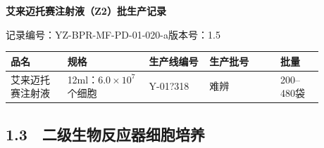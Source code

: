 \documentclass[UTF8,10pt,a4paper,fontset=fandol]{ctexart}
\newcommand{\fieldvalue}[1]{#1}
\newcommand{\handwritten}[1]{#1}
\begin{document}
\newpage

\begin{center}
{\Large \textbf{艾来迈托赛注射液（Z2）批生产记录}}
\end{center}

\noindent
记录编号：YZ-BPR-MF-PD-01-020-a\hfill 版本号：1.5

\begin{center}
\begin{tabular}{|p{0.16\linewidth}|p{0.23\linewidth}|p{0.17\linewidth}|p{0.20\linewidth}|p{0.12\linewidth}|}
\hline
品名 & 规格 & 生产线编号 & 生产批号 & 批量 \\
\hline
艾来迈托赛注射液 & 12ml：$6.0\times10^7$个细胞 &
\fieldvalue{\handwritten{Y-01?318}} &
\fieldvalue{\handwritten{难辨}} &
200--480袋 \\
\hline
\end{tabular}
\end{center}

\subsection*{1.3　二级生物反应器细胞培养}
\end{document}
